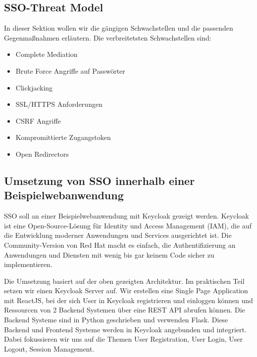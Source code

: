 \documentclass[12pt]{article}
\begin{document}
\subsection{SSO-Threat Model}
	
In dieser Sektion wollen wir die gängigen Schwachstellen und die passenden Gegenmaßnahmen erläutern.
Die verbreitetsten Schwachstellen sind:
	
\begin{itemize}
	\item Complete Mediation
		
	\item Brute Force Angriffe auf Passwörter
		
	\item Clickjacking
	
		
	\item SSL/HTTPS Anforderungen
	
	\item CSRF Angriffe
	
	\item Kompromittierte Zugangstoken
	
	\item Open Redirectors
\end{itemize}

\subsection{Umsetzung von SSO innerhalb einer Beispielwebanwendung}
SSO soll an einer Beispielwebanwendung mit Keycloak gezeigt werden. Keycloak ist eine Open-Source-Lösung für Identity und Access Management (IAM), die auf die Entwicklung moderner Anwendungen und Services ausgerichtet ist. Die Community-Version von Red Hat macht es einfach, die Authentifizierung an Anwendungen und Diensten mit wenig bis gar keinem Code sicher zu implementieren. \cite{RFC6819}

Die Umsetzung basiert auf der oben gezeigten Architektur. Im praktischen Teil setzen wir einen Keycloak Server auf. Wir erstellen eine Single Page Application mit ReactJS, bei der sich User in Keycloak registrieren und einloggen können und Ressourcen von 2 Backend Systemen über eine REST API abrufen können. Die Backend Systeme sind in Python geschrieben und verwenden Flask. Diese Backend und Frontend Systeme werden in Keycloak angebunden und integriert. Dabei fokussieren wir uns auf die Themen User Registration, User Login, User Logout, Session Management. 
	
\end{document}
